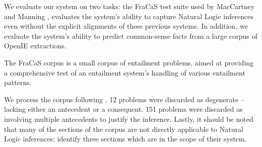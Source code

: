 We evaluate our system on two tasks: the FraCaS test suite used
  by MacCartney and Manning ,
  evaluates the system's ability to capture Natural Logic inferences
  even without the explicit alignments of these previous systems.
In addition, we evaluate the system's ability to predict common-sense
  facts from a large corpus of OpenIE extractions.

%
%
The FraCaS corpus \cite{key:1996cooper-fracas}
  is a small corpus of entailment problems, aimed at providing a
  comprehensive test of an entailment system's handling of various
  entailment patterns.

We process the corpus following .
12 problems were discarded as degenerate -- lacking either an antecedent or
  a consequent.
151 problems were discarded as involving multiple antecedents to
  justify the inference.
Lastly, it should be noted that many of the sections of the corpus
  are not directly applicable to Natural Logic inferences;
   identify three sections which
  are in the scope of their system.

